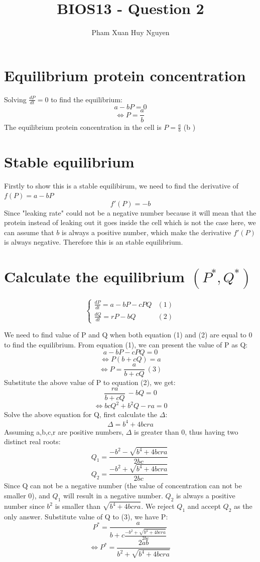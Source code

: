 \documentclass{article}
\title{BIOS13 - Question 2}
\author{Pham Xuan Huy Nguyen}
\begin{document}
\maketitle

\section{Equilibrium protein concentration}
Solving \(\frac{dP}{dt}=0\) to find the equilibrium:
\[ a-bP=0 \]
\[ \Leftrightarrow P=\frac{a}{b}\ \]
The equilibrium protein concentration in the cell is \(P=\frac{a}{b}\) (b )
\section{Stable equilibrium}
Firstly to show this is a stable equilibirum, we need to find the derivative of \(f(P)=a-bP\)
\[f'(P)=-b\]
Since "leaking rate" could not be a negative number because it will mean that the protein instead of leaking out it goes inside the cell which is not the case here, we can assume that \(b\) is always a positive number, which make the derivative \(f'(P)\) is always negative. Therefore this is an stable equilibrium.
\section{Calculate the equilibrium \((P^*, Q^*)\)}

\begin{equation*}
  \begin{cases}
    \frac{dP}{dt}=a-bP-cPQ & (1) \\
    \frac{dQ}{dt}=rP-bQ & (2)
  \end{cases}
\end{equation*}

We need to find value of P and Q when both equation (1) and (2) are equal to 0 to find the equilibrium. From equation (1), we can present the value of P as Q:
\[ a-bP-cPQ=0 \]
\[ \Leftrightarrow P(b+cQ)=a \]
\[ \Leftrightarrow P=\frac{a}{b+cQ}\ (3) \]
Substitute the above value of P to equation (2), we get:
\[ \frac{ra}{b+cQ}\ - bQ=0 \]
\[ \Leftrightarrow bcQ^2 + b^2Q - ra = 0 \]
Solve the above equation for Q, first calculate the \(\Delta \):
\[ \Delta = b^4 +4bcra \]
Assuming a,b,c,r are positive numbers, \(\Delta \) is greater than 0, thus having two distinct real roots:
\[  Q_1 = \frac{-b^2-\sqrt{b^4+4bcra}}{2bc}\ \]
\[  Q_2 = \frac{-b^2+\sqrt{b^4+4bcra}}{2bc}\ \]
Since Q can not be a negative number (the value of concentration can not be smaller 0), and \(Q_1\) will result in a negative number. \(Q_2\) is always a positive number since \(b^2\) is smaller than \(\sqrt{b^4+4bcra}\).  We reject \(Q_1\) and accept \(Q_2\) as the only answer. Substitute value of Q to (3), we have P:
\[ P^*=\frac{a}{b+c\frac{-b^2+\sqrt{b^4+4bcra}}{2bc}}\ \]
\[ 	\Leftrightarrow P^*=\frac{2ab}{b^2+\sqrt{b^4+4bcra}}\ \]
\end{document}
